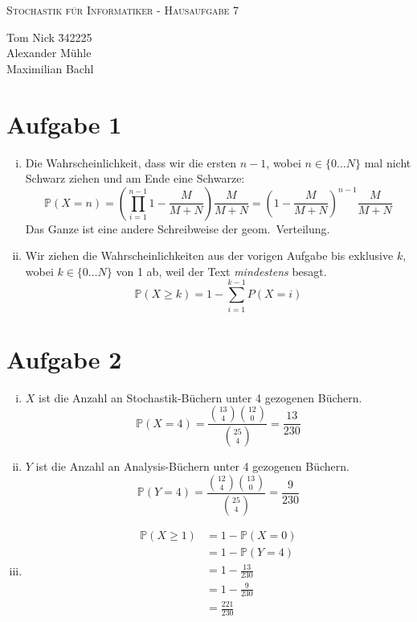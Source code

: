 \documentclass[10pt,a4paper,parskip=half]{scrartcl}
\begin{document}
\begin{center}
\textsc{\Large{Stochastik für Informatiker - Hausaufgabe 7}} \\
\end{center}
\begin{tabbing}
Tom Nick \hspace{1.4cm}\= 342225\\
Alexander Mühle\\
Maximilian Bachl
\end{tabbing}
\section*{Aufgabe 1}
\begin{enumerate}[(i)]
\item
Die Wahrscheinlichkeit, dass wir die ersten $n-1$, wobei $n \in \{0\dots N\}$ mal nicht Schwarz ziehen und am Ende eine Schwarze:
$$\mathbb P(X = n) = \left(\prod_{i=1}^{n-1} 1-\frac{M}{M+N}\right) \frac{M}{M+N} = \left(1- \frac{M}{M+N}\right)^{n-1}\frac{M}{M+N}$$
Das Ganze ist eine andere Schreibweise der geom.~Verteilung.
\item
Wir ziehen die Wahrscheinlichkeiten aus der vorigen Aufgabe bis exklusive $k$, wobei $k \in \{0\dots N\}$ von 1 ab, weil der Text \textit{mindestens} besagt.
$$ \mathbb P(X \ge k) = 1 - \sum_{i=1}^{k-1} P(X = i)$$
\end{enumerate}
\section*{Aufgabe 2}
\begin{enumerate}[(i)]
\item
$X$ ist die Anzahl an Stochastik-Büchern unter 4 gezogenen Büchern.
$$\mathbb P(X=4) = \frac{{13\choose 4} {12 \choose 0}}{{25 \choose 4}} = \frac{13}{230}$$
\item
$Y$ ist die Anzahl an Analysis-Büchern unter 4 gezogenen Büchern.
$$\mathbb P(Y=4) = \frac{{12\choose 4} {13 \choose 0}}{{25 \choose 4}} = \frac{9}{230}$$
\item
\begin{align*}
\mathbb P(X\ge 1) &= 1 - \mathbb P(X= 0)\\
&= 1 - \mathbb P(Y= 4)\\
&= 1 - \frac{13}{230}\\
&= 1 - \frac 9 {230}\\
&= \frac{221}{230}
\end{align*}
\end{enumerate}
\end{document}
